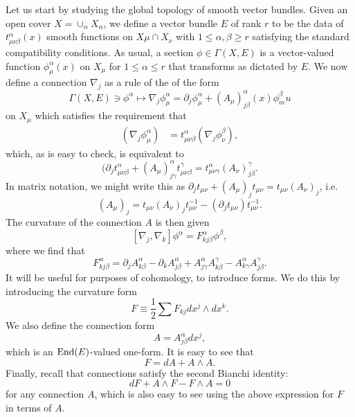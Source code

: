 \documentclass{../mathnotes}
\begin{document}
Let us start by studying the global topology of smooth vector bundles. Given an open cover $X=\cup_\alpha X_\alpha$,
we define a vector bundle $E$ of rank $r$ to be the data of $t_{\mu\nu\beta}^\alpha(x)$ smooth functions on $X\mu\cap X_\nu$
with $1\leq\alpha,\beta\geq r$ satisfying the standard compatibility conditions. As usual, a section $\phi\in\Gamma(X,E)$
is a vector-valued function $\phi^\alpha_\mu(x)$ on $X_\mu$ for $1\leq\alpha\leq r$ that transforms as dictated by $E$.
We now define a connection $\nabla_j$ as a rule of the of the form
\[\Gamma(X,E)\ni\phi^\alpha\mapsto\nabla_j\phi^\alpha_\mu=\partial_j\phi^\alpha_\mu+(A_\mu)_{j\beta}^\alpha(x)\phi^\beta_mu\]
on $X_\mu$ which satisfies the requirement that
\begin{align*}
    (\nabla_j\phi_\mu^\alpha)&=t_{\mu\nu\beta}^\alpha(\nabla_j\phi_\nu^\beta),
\end{align*}
which, as is easy to check, is equivalent to
\[(\partial_jt_{\mu\nu\beta}^\alpha+(A_\mu)^\alpha_{j\gamma}t_{\mu\nu\beta}^\gamma=t_{\mu\nu\gamma}^\alpha(A_\nu)^\gamma_{j\beta}.\]
In matrix notation, we might write this as $\partial_jt_{\mu\nu}+(A_\mu)_jt_{\mu\nu}=t_{\mu\nu}(A_\nu)_j$, i.e.
\[(A_\mu)_j=t_{\mu\nu}(A_\nu)_jt_{\mu\nu}^{-1}-(\partial_jt_{\mu\nu})t_{\mu\nu}^{-1}.\]
The curvature of the connection $A$ is then given
\[ [\nabla_j,\nabla_k]\phi^\alpha=F_{kj\beta}^\alpha\phi^\beta,\]
where we find that
\[F_{kj\beta}^\alpha=\partial_jA_{k\beta}^\alpha-\partial_kA_{j\beta}^\alpha+A_{j\gamma}^\alpha A_{k\beta}^\gamma-A_{k\gamma}^\alpha A_{j\beta}^\gamma.\]
It will be useful for purposes of cohomology, to introduce forms. We do this by introducing the curvature form
\[F\equiv \frac{1}{2}\sum F_{kj}dx^j\wedge dx^k.\]
We also define the connection form
\[A=A_{j\beta}^\alpha dx^j,\]
which is an $\operatorname{End}(E)$-valued one-form. It is easy to see that
\[F=dA+A\wedge A.\]
Finally, recall that connections satisfy the second Bianchi identity:
\[dF+A\wedge F-F\wedge A=0\]
for any connection $A$, which is also easy to see using the above expression for $F$ in terms of $A$.
\end{document}
